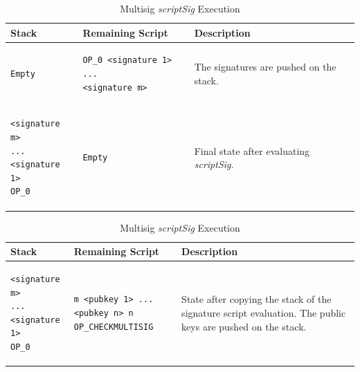 \begin{table}[!ht]  
\begin{minipage}{\textwidth}

\centering
\begin{tabular}{| m{95pt} | m{145pt} | m{100pt} |}

\hline
\textbf{Stack} & \textbf{Remaining Script} & \textbf{Description} \\ \hline \hline

\vspace{8pt}
\begin{BVerbatim}[fontsize==\relsize{-4}]
Empty
\end{BVerbatim} 
\vspace{4pt}
&
\vspace{8pt}
\begin{BVerbatim}[fontsize==\relsize{-4}]
OP_0 <signature 1> ...
<signature m>
\end{BVerbatim} 
\vspace{4pt}
&
The signatures are pushed on the stack.\\ \hline

\vspace{8pt}
\begin{BVerbatim}[fontsize==\relsize{-4}]
<signature m>
...
<signature 1>
OP_0
\end{BVerbatim} 
\vspace{4pt}
&
\vspace{8pt}
\begin{BVerbatim}[fontsize==\relsize{-4}]
Empty
\end{BVerbatim} 
\vspace{4pt}
&
Final state after evaluating \textit{scriptSig}. \\ \hline

\end{tabular}
\vspace{5pt}
\caption{Multisig \textit{scriptSig} Execution}
\label{tab:P2Multisig1}


\vspace{15pt}


\begin{tabular}{| m{95pt} | m{145pt} | m{100pt} |}
\hline
\textbf{Stack} & \textbf{Remaining Script} & \textbf{Description} \\ \hline \hline

\vspace{8pt}
\begin{BVerbatim}[fontsize==\relsize{-4}]
<signature m>
...
<signature 1>
OP_0
\end{BVerbatim}
\vspace{4pt}
&
\vspace{8pt}
\begin{BVerbatim}[fontsize==\relsize{-4}]
m <pubkey 1> ... <pubkey n> n
OP_CHECKMULTISIG
\end{BVerbatim} 
\vspace{4pt}
&
State after copying the stack of the signature script evaluation. The public keys are pushed on the stack.\\ \hline	


\end{tabular}
\end{minipage}
\end{table}
